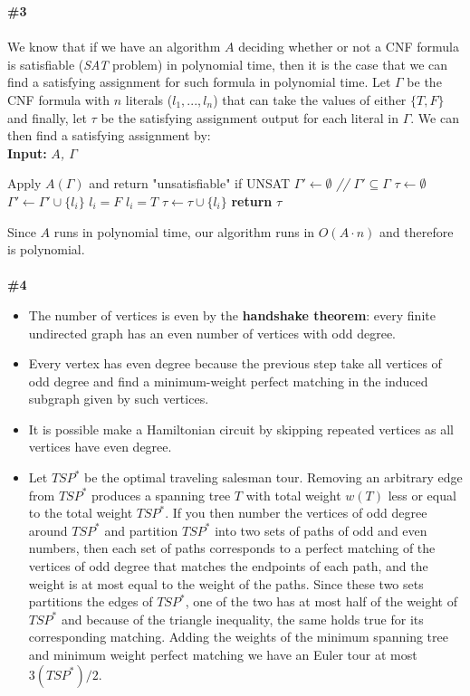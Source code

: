\documentclass{article}
\begin{document}
\textbf{\#3}
\\
\\
We know that if we have an algorithm $A$ deciding whether or not a CNF formula is satisfiable (\textit{SAT} problem) in polynomial time, then it is the case that we can find a satisfying assignment for such formula in polynomial time. Let $\Gamma$ be the CNF formula with $n$ literals ($l_1, ..., l_n$) that can take the values of either $\{ T, F\}$ and finally, let $\tau$ be the satisfying assignment output for each literal in $\Gamma$. We can then find a satisfying assignment by:
\\
\newpage
\textbf{Input:} \textit{$A$, $\Gamma$}
\begin{algorithmic}
\State Apply $A(\Gamma)$ and return "unsatisfiable" if UNSAT
\State $\Gamma' \gets \emptyset$ \textit{ // $\Gamma' \subseteq \Gamma$}
\State $\tau \gets \emptyset$
  \State $\Gamma' \gets \Gamma' \cup \{l_i\}$
  \State $l_i = F$
    \State $l_i = T$
  \EndIf
  \State $\tau \gets \tau \cup \{ l_i\}$
\EndFor
\State \textbf{return} $\tau$\\
\end{algorithmic}
Since $A$ runs in polynomial time, our algorithm runs in $O(A \cdot n)$ and therefore is polynomial.
\\
\\
\textbf{\#4}
\begin{itemize}
\item The number of vertices is even by the \textbf{handshake theorem}: every finite undirected graph has an even number of vertices with odd degree.
\item Every vertex has even degree because the previous step take all vertices of odd degree and find a minimum-weight perfect matching in the induced subgraph given by such vertices.
\item It is possible make a Hamiltonian circuit by skipping repeated vertices as all vertices have even degree.
\item Let $TSP^*$ be the optimal traveling salesman tour. Removing an arbitrary edge from $TSP^*$ produces a spanning tree $T$ with total weight $w(T)$ less or equal to the total weight $TSP^*$. If you then number the vertices of odd degree around $TSP^*$ and partition $TSP^*$ into two sets of paths of odd and even numbers, then each set of paths corresponds to a perfect matching of the vertices of odd degree that matches the endpoints of each path, and the weight is at most equal to the weight of the paths. Since these two sets partitions the edges of $TSP^*$, one of the two has at most half of the weight of $TSP^*$ and because of the triangle inequality, the same holds true for its corresponding matching. Adding the weights of the minimum spanning tree and minimum weight perfect matching we have an Euler tour at most $3(TSP^*)/2$.
\\
\end{itemize}
\end{document}
